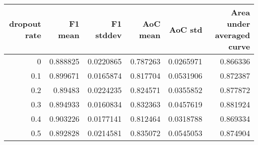 \begin{tabular}{rrrrrr}
\toprule
   dropout rate &   F1 mean &   F1 stddev &   AoC mean &   AoC std &   Area under averaged curve \\
\midrule
            0   &  0.888825 &   0.0220865 &   0.787263 & 0.0265971 &                    0.866336 \\
            0.1 &  0.899671 &   0.0165874 &   0.817704 & 0.0531906 &                    0.872387 \\
            0.2 &  0.89483  &   0.0224235 &   0.824571 & 0.0355852 &                    0.877872 \\
            0.3 &  0.894933 &   0.0160834 &   0.832363 & 0.0457619 &                    0.881924 \\
            0.4 &  0.903226 &   0.0177141 &   0.812464 & 0.0318788 &                    0.869334 \\
            0.5 &  0.892828 &   0.0214581 &   0.835072 & 0.0545053 &                    0.874904 \\
\bottomrule
\end{tabular}